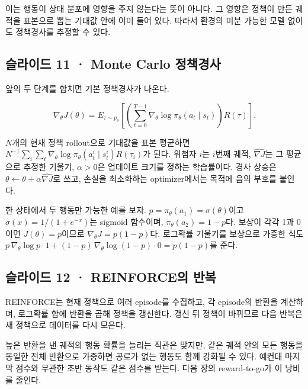 \documentclass[11pt,a4paper]{article}
\begin{document}
이는 행동이 상태 분포에 영향을 주지 않는다는 뜻이 아니다. 그 영향은 정책이 만든 궤적을 표본으로 뽑는 기대값 안에 이미 들어 있다. 따라서 환경의 미분 가능한 모델 없이도 정책경사를 추정할 수 있다.\par

\subsection{슬라이드 11 · Monte Carlo 정책경사}

앞의 두 단계를 합치면 기본 정책경사가 나온다.\par

\[
\nabla_\theta J(\theta)
=E_{\tau\sim p_\theta}\!\left[
\left(\sum_{t=0}^{T-1}\nabla_\theta\log\pi_\theta(a_t\mid s_t)\right)
R(\tau)\right].
\]

$N$개의 현재 정책 rollout으로 기대값을 표본 평균하면 $N^{-1}\sum_i\sum_t\nabla_\theta\log\pi_\theta(a_t^i\mid s_t^i)R(\tau_i)$가 된다. 위첨자 $i$는 $i$번째 궤적, $\widehat{\nabla J}$는 그 평균으로 추정한 기울기, $\alpha>0$은 업데이트 크기를 정하는 학습률이다. 경사 상승은 $\theta\leftarrow\theta+\alpha\widehat{\nabla J}$로 쓰고, 손실을 최소화하는 optimizer에서는 목적에 음의 부호를 붙인다.\par

한 상태에서 두 행동만 가능한 예를 보자. $p=\pi_\theta(a_1)=\sigma(\theta)$이고 $\sigma(x)=1/(1+e^{-x})$는 sigmoid 함수이며, $\pi_\theta(a_2)=1-p$다. 보상이 각각 1과 0이면 $J(\theta)=p$이므로 $\nabla_\theta J=p(1-p)$다. 로그확률 기울기를 보상으로 가중한 식도 $p\,\nabla_\theta\log p\cdot1+(1-p)\,\nabla_\theta\log(1-p)\cdot0=p(1-p)$를 준다.\par

\subsection{슬라이드 12 · REINFORCE의 반복}

REINFORCE는 현재 정책으로 여러 episode를 수집하고, 각 episode의 반환을 계산하며, 로그확률 합에 반환을 곱해 정책을 갱신한다. 갱신 뒤 정책이 바뀌므로 다음 반복은 새 정책으로 데이터를 다시 모은다.\par

높은 반환을 낸 궤적의 행동 확률을 늘리는 직관은 맞지만, 같은 궤적 안의 모든 행동을 동일한 전체 반환으로 가중하면 공로가 없는 행동도 함께 강화될 수 있다. 예컨대 마지막 점수와 무관한 초반 동작도 같은 점수를 받는다. 다음 장의 reward-to-go가 이 낭비를 줄인다.\par
\end{document}
